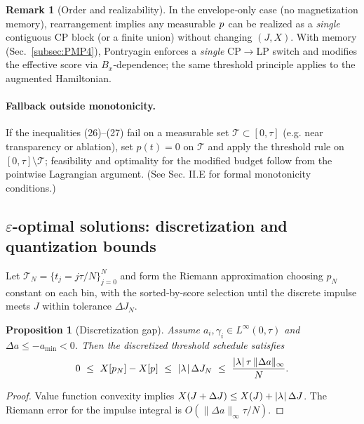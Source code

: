 \documentclass[aps,pre,twocolumn,showpacs,superscriptaddress]{revtex4-2}
\newtheorem{proposition}[theorem]{Proposition}
\theoremstyle{definition}
\newtheorem{remark}[theorem]{Remark}
\begin{document}
\begin{remark}[Order and realizability]
In the envelope‑only case (no magnetization memory), rearrangement implies any measurable $p^{\*}$ can be realized as a \emph{single} contiguous CP block (or a finite union) without changing $(J,X)$. With memory (Sec.~\ref{subsec:PMP4}), Pontryagin enforces a \emph{single} CP$\to$LP switch and modifies the effective score via $B_x$‑dependence; the same threshold principle applies to the augmented Hamiltonian.
\end{remark}

\paragraph*{Fallback outside monotonicity.}
If the inequalities (26)–(27) fail on a measurable set $\mathcal{T} \subset [0,\tau]$ (e.g. near transparency or ablation), set $p(t) = 0$ on $\mathcal{T}$ and apply the threshold rule on $[0,\tau] \setminus \mathcal{T}$; feasibility and optimality for the modified budget follow from the pointwise Lagrangian argument. (See Sec. II.E for formal monotonicity conditions.)

\subsection{$\varepsilon$-optimal solutions: discretization and quantization bounds}\label{subsec:epsilon5}

Let $\mathcal{T}_N=\{t_j=j\tau/N\}_{j=0}^N$ and form the Riemann approximation choosing $p_N$ constant on each bin, with the sorted‑by‑score selection until the discrete impulse meets $J$ within tolerance $\Delta J_N$.

\begin{proposition}[Discretization gap]\label{prop:disc5}
Assume $a_i,\gamma_i\in L^\infty(0,\tau)$ and $\Delta a\le -a_{\min}<0$. Then the discretized threshold schedule satisfies
\begin{equation}\label{eq:gap-disc5}
0\ \le\ X[p_N]-X[p^{\*}]\ \le\ |\lambda^{\*}|\,\Delta J_N \ \le\ \frac{|\lambda^{\*}|\,\tau\,\|\Delta a\|_\infty}{N}.
\end{equation}
\end{proposition}

\begin{proof}
Value function convexity implies $X(J+\Delta J)\le X(J)+|\lambda^{\*}|\,\Delta J$. The Riemann error for the impulse integral is $O(\|\Delta a\|_\infty\tau/N)$.
\end{proof}
\end{document}
